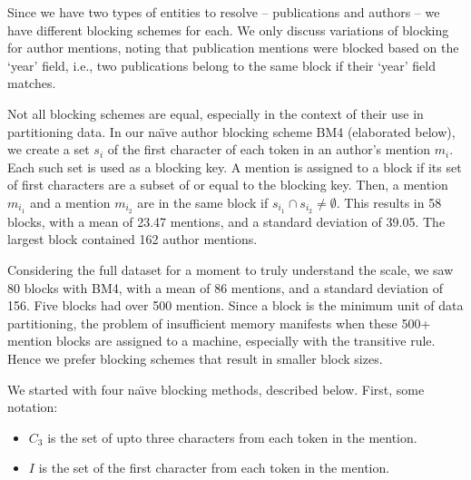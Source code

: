 \documentclass{article}
\begin{document}
            Since we have two types of entities to resolve -- publications and authors -- we have different blocking schemes for each. We only discuss variations of blocking for author mentions, noting that publication mentions were blocked based on the `year' field, i.e., two publications belong to the same block if their `year' field matches.
            
            Not all blocking schemes are equal, especially in the context of their use in partitioning data. In our na\"{\i}ve author blocking scheme BM4 (elaborated below), we create a set $s_i$ of the first character of each token in an author's mention $m_i$. Each such set is used as a blocking key. A mention is assigned to a block if its set of first characters are a subset of or equal to the blocking key. Then, a mention $m_{i_1}$ and a mention $m_{i_2}$ are in the same block if $s_{i_1} \cap s_{i_2} \neq \emptyset$. This results in 58 blocks, with a mean of 23.47 mentions, and a standard deviation of 39.05. The largest block contained 162 author mentions. 
            
            Considering the full dataset for a moment to truly understand the scale, we saw 80 blocks with BM4, with a mean of 86 mentions, and a standard deviation of 156. Five blocks had over 500 mention. Since a block is the minimum unit of data partitioning, the problem of insufficient memory manifests when these 500+ mention blocks are assigned to a machine, especially with the transitive rule. Hence we prefer blocking schemes that result in smaller block sizes.
            
            We started with four na\"{\i}ve blocking methods, described below. First, some notation:
            
            \begin{itemize}
                \item $C_3$ is the set of upto three characters from each token in the mention.
                \item $I$ is the set of the first character from each token in the mention.
            \end{itemize}
            
\end{document}
